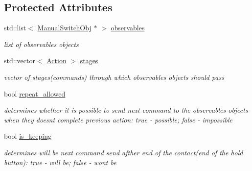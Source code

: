 \subsection*{Protected Attributes}
\begin{DoxyCompactItemize}
\item 
\mbox{\label{class_sensor_a3056529f52d9af83b78bc7ca7e2e7ef2}} 
std\+::list$<$ \hyperlink{class_manual_switch_obj}{Manual\+Switch\+Obj} $\ast$ $>$ \hyperlink{class_sensor_a3056529f52d9af83b78bc7ca7e2e7ef2}{observables}
\begin{DoxyCompactList}\small\item\em list of observables objects \end{DoxyCompactList}\item 
\mbox{\label{class_sensor_a2450a980532d0448e7ea1f9db91f79f7}} 
std\+::vector$<$ \hyperlink{_manual_switch_obj_8h_a8bb1ef53467e4f61410d12822d922498}{Action} $>$ \hyperlink{class_sensor_a2450a980532d0448e7ea1f9db91f79f7}{stages}
\begin{DoxyCompactList}\small\item\em vector of stages(commands) through which observables objects should pass \end{DoxyCompactList}\item 
\mbox{\label{class_sensor_a8554cb0f6e9cfcc6f277795bdd45ce14}} 
bool \hyperlink{class_sensor_a8554cb0f6e9cfcc6f277795bdd45ce14}{repeat\+\_\+allowed}
\begin{DoxyCompactList}\small\item\em determines whether it is possible to send next command to the observables objects when they doesn\textquotesingle{}t complete previous action\+: \textquotesingle{}true\textquotesingle{} -\/ possible; \textquotesingle{}false\textquotesingle{} -\/ impossible \end{DoxyCompactList}\item 
\mbox{\label{class_sensor_ace9f91b1e1034b501ba8f16e46b61698}} 
bool \hyperlink{class_sensor_ace9f91b1e1034b501ba8f16e46b61698}{is\+\_\+keeping}
\begin{DoxyCompactList}\small\item\em determines will be next command send afther end of the contact(end of the hold button)\+: \textquotesingle{}true\textquotesingle{} -\/ will be; \textquotesingle{}false\textquotesingle{} -\/ won\textquotesingle{}t be \end{DoxyCompactList}\item 

\end{DoxyCompactItemize}
